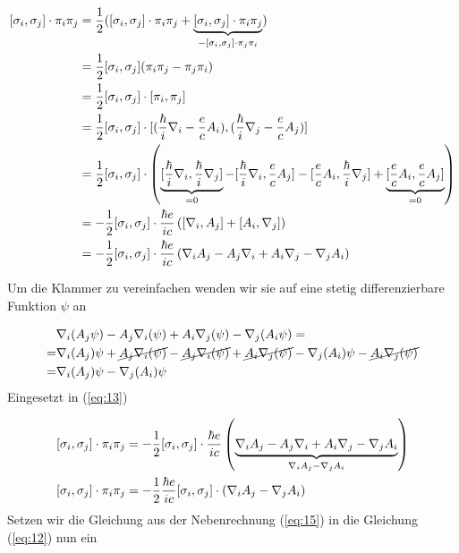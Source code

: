 \begin{align}
  \label{eq:13}
  [\sigma_i,\sigma_j]\cdot \pi_i\pi_j  &= \frac{1}{2}(  [\sigma_i,\sigma_j]\cdot \pi_i\pi_j + \underbr{  [\sigma_i,\sigma_j]\cdot  \pi_i\pi_j}_{-[\sigma_i,\sigma_j]\cdot \pi_j\pi_i} )\notag\\
 &=\frac{1}{2} [\sigma_i,\sigma_j] (\pi_i\pi_j-\pi_j\pi_i)\notag\\
&= \frac{1}{2} [\sigma_i,\sigma_j]\cdot [\pi_i,\pi_j] \notag\\
&= \frac{1}{2}[\sigma_i,\sigma_j]\cdot[(\frac{\hbar}{i}\nabla_i-\frac{e}{c}A_i),(\frac{\hbar}{i}\nabla_j-\frac{e}{c}A_j) ] \notag\\
&= \frac{1}{2} [\sigma_i,\sigma_j]\cdot\left(\underbr{[\frac{\hbar}{i}\nabla_i,\frac{\hbar}{i}\nabla_j]}_{=0}-[\frac{\hbar}{i}\nabla_i, \frac{e}{c}A_j]- [\frac{e}{c}A_i,\frac{\hbar}{i}\nabla_j]+ \underbr{[\frac{e}{c}A_i,\frac{e}{c}A_j]}_{=0}\right) \notag\\
&= -\frac{1}{2} [\sigma_i,\sigma_j]\cdot\frac{\hbar e}{ic} \left( [\nabla_i, A_j] + [A_i,\nabla_j]\right) \notag\\
&= -\frac{1}{2} [\sigma_i,\sigma_j]\cdot\frac{\hbar e}{ic} \left( \nabla_i A_j-A_j\nabla_i + A_i\nabla_j-\nabla_jA_i\right)
\end{align}

Um die Klammer zu vereinfachen wenden wir sie auf eine stetig differenzierbare Funktion \(\psi\) an

\begin{align}
  \label{eq:14}
  &\nabla_i (A_j\psi) -A_j\nabla_i(\psi) + A_i\nabla_j(\psi)-\nabla_j(A_i\psi)= \notag\\
  =&\nabla_i (A_j)\psi + \cancel{A_j\nabla_i(\psi)} -\cancel{A_j\nabla_i(\psi)} + \cancel{A_i\nabla_j(\psi)} - \nabla_j(A_i)\psi - \cancel{A_i\nabla_j(\psi)} \notag\\
  =&\nabla_i (A_j)\psi  - \nabla_j(A_i)\psi 
\end{align}
Eingesetzt in (\ref{eq:13})


\begin{align}
  \label{eq:15}
 [\sigma_i,\sigma_j]\cdot\pi_i\pi_j  &= -\frac{1}{2} [\sigma_i,\sigma_j]\cdot\frac{\hbar e}{ic} \left( \underbr{\nabla_i A_j-A_j\nabla_i + A_i\nabla_j-\nabla_jA_i}_{\nabla_i A_j  - \nabla_j A_i}\right) \notag\\
  [\sigma_i,\sigma_j]\cdot\pi_i\pi_j  &= -\frac{1}{2} \frac{\hbar e}{ic} [\sigma_i,\sigma_j]\cdot\left( \nabla_i A_j  - \nabla_j A_i\right) \notag\\
\end{align}
Setzen wir die Gleichung aus der Nebenrechnung (\ref{eq:15}) in die Gleichung (\ref{eq:12}) nun ein

